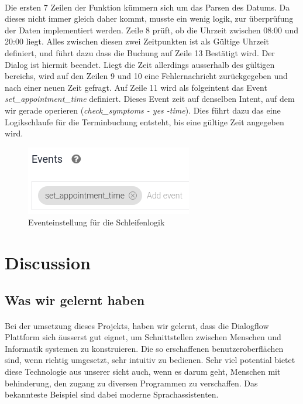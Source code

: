 \documentclass[11pt, letterpaper]{article}
\begin{document}
        \paragraph{}
            Die ersten 7 Zeilen der Funktion kümmern sich um das Parsen des Datums. Da dieses nicht immer gleich daher kommt,
            musste ein wenig logik, zur überprüfung der Daten implementiert werden. Zeile 8 prüft, ob die Uhrzeit zwischen 08:00
            und 20:00 liegt. Alles zwischen diesen zwei Zeitpunkten ist als Gültige Uhrzeit definiert, und führt dazu dass die
            Buchung auf Zeile 13 Bestätigt wird. Der Dialog ist hiermit beendet. Liegt die Zeit allerdings ausserhalb des gültigen
            bereichs, wird auf den Zeilen 9 und 10 eine Fehlernachricht zurückgegeben und nach einer neuen Zeit gefragt.
            Auf Zeile 11 wird als folgeintent das Event \emph{set\_appointment\_time} definiert. Dieses Event zeit auf denselben 
            Intent, auf dem wir gerade operieren (\emph{check\_symptoms - yes -time}). Dies führt dazu das eine Logikschlaufe für 
            die Terminbuchung entsteht, bis eine gültige Zeit angegeben wird.

        \begin{figure}[h!]
            \begin{center}
                \includegraphics[width=0.5\linewidth]{ressources/eventSetting.png}
            \end{center}
            \caption{Eventeinstellung für die Schleifenlogik}
            \label{fig:eventSetting}
        \end{figure}
 
\newpage

\section{Discussion}
    \subsection{Was wir gelernt haben}
        \paragraph{}
            Bei der umsetzung dieses Projekts, haben wir gelernt, dass die Dialogflow Plattform sich äusserst gut eignet, um Schnittstellen
            zwischen Menschen und Informatik systemen zu konstruieren. Die so erschaffenen benutzeroberflächen sind, wenn richtig umgesetzt,
            sehr intuitiv zu bedienen. Sehr viel potential bietet diese Technologie aus unserer sicht auch, wenn es darum geht, Menschen mit
            behinderung, den zugang zu diversen Programmen zu verschaffen. Das bekannteste Beispiel sind dabei moderne Sprachassistenten.
\end{document}

